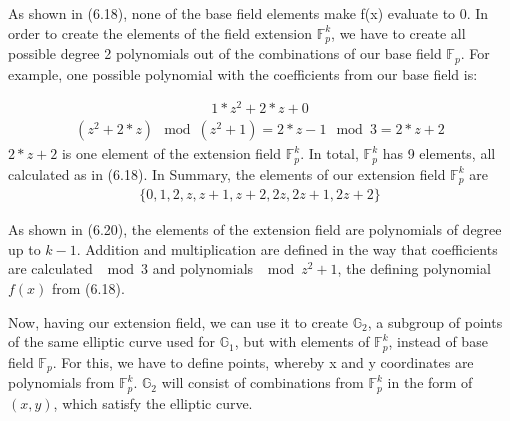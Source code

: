 As shown in (6.18), none of the base field elements make f(x) evaluate to 0. In order to create the elements of the field extension \begin{math}\mathbb{F}_p^k\end{math}, we have to create all possible degree 2 polynomials out of the combinations of our base field \begin{math}\mathbb{F}_p\end{math}. For example, one possible polynomial with the coefficients from our base field is:

\begin{align}
    1*z^2+2*z+0 
\end{align}   
\begin{align*}
    (z^2+2*z)\mod (z^2+1) = 2*z-1\mod 3 = 2*z+2
\end{align*}
\(2*z+2\) is one element of the extension field \begin{math}\mathbb{F}_p^k\end{math}. In total, \begin{math}\mathbb{F}_p^k\end{math} has 9 elements, all calculated as in (6.18). In Summary, the elements of our extension field \begin{math}\mathbb{F}_p^k\end{math} are
\begin{align}
\{0, 1, 2, z, z+1, z+2, 2z, 2z+1, 2z+2\}
\end{align}

As shown in (6.20), the elements of the extension field are polynomials of degree up to \(k-1\). Addition and multiplication are defined in the way that coefficients are calculated \(\mod 3\) and polynomials \(\mod z^2+1\), the defining polynomial  
\(f(x)\) from (6.18).

Now, having our extension field, we can use it to create \begin{math}\mathbb{G}_2\end{math}, a subgroup of points of the same elliptic curve used for \begin{math}\mathbb{G}_1\end{math}, but with elements of \begin{math}\mathbb{F}_p^k\end{math}, instead of base field \begin{math}\mathbb{F}_p\end{math}. For this, we have to define points, whereby x and y coordinates are polynomials from \begin{math}\mathbb{F}_p^k\end{math}. \begin{math}\mathbb{G}_2\end{math} will consist of combinations from \begin{math}\mathbb{F}_p^k\end{math} in the form of \((x,y)\), which satisfy the elliptic curve. 

